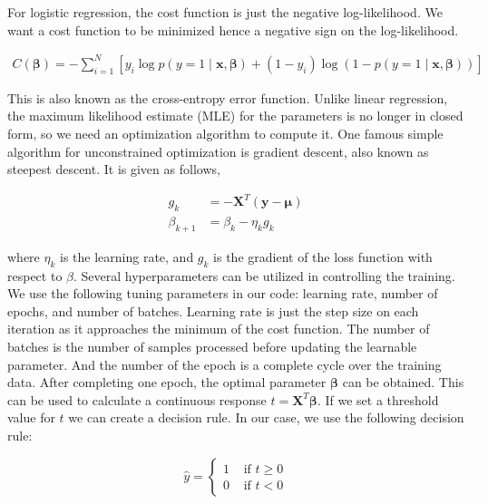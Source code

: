 For logistic regression, the cost function is just the negative log-likelihood. We want a cost function to be minimized hence a negative sign on the log-likelihood.

\begin{align}
      C(\boldsymbol{\beta}) =-\sum_{i=1}^{N}\left[y_{i} \log p(y=1\mid  \mathbf{x}, \boldsymbol{\beta} )+\left(1-y_{i}\right) \log \left(1-p(y=1\mid  \mathbf{x}, \boldsymbol{\beta} )\right)\right]
\end{align}

This is also known as the cross-entropy error function. Unlike linear regression, the maximum likelihood estimate (MLE) for the parameters is no longer in closed form, so we need an optimization algorithm to compute it. One famous simple algorithm for unconstrained optimization is gradient descent, also known as steepest descent. It is given as follows,


\begin{align}
    g_k &= -\mathbf{X}^T(\mathbf{y}-\mathbf{\mu}) \\
    \beta_{k+1} &= \beta_k - \eta_k g_k
\end{align}

where $\eta_k$ is the learning rate, and $g_k$ is the gradient of the loss function with respect to $\mathcal{\beta}$.  Several hyperparameters can be utilized in controlling the training. We use the following tuning parameters in our code: learning rate, number of epochs, and number of batches. Learning rate is just the step size on each iteration as it approaches the minimum of the cost function. The number of batches is the number of samples processed before updating the learnable parameter. And the number of the epoch is a complete cycle over the training data. After completing one epoch, the optimal parameter $\boldsymbol{\beta}$ can be obtained. This can be used to calculate a continuous response $t =\boldsymbol{X}^T \boldsymbol\beta$. If we set a threshold value for $t$ we can create a decision rule. In our case, we use the following decision rule:

\begin{equation}
    \hat{y}=\begin{cases}
        1 & \text{ if } t \geq 0 \\
        0 & \text{ if } t < 0
    \end{cases}
\end{equation}






